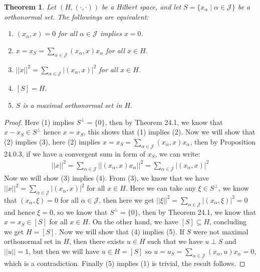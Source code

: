 \documentclass[11pt]{book}
\theoremstyle{break}
\theoremstyle{break}
\newtheorem{thm}{Theorem}[section]
\begin{document}
\begin{thm}
Let $(H,(\cdot,\cdot))$ be a Hilbert space, and let $S = \{x_\alpha \mid \alpha \in \mathcal{J}\}$ be a orthonormal set. The followings are equivalent:
\begin{enumerate}[topsep=3pt,itemsep=-1ex,partopsep=1ex,parsep=1ex]
\item $(x_\alpha ,x) = 0$ for all $\alpha \in \mathcal{J}$ implies $x = 0$.
\item $x = x_S = \sum_{\alpha \in \mathcal{J}}(x_\alpha, x) x_\alpha $ for all $x \in H$.
\item $||x||^2 =\sum_{\alpha \in \mathcal{J}}|(x_\alpha ,x)|^2$ for all $x \in H$.
\item $[S] = H$.
\item $S$ is a maximal orthonormal set in $H$.
\end{enumerate}
\end{thm}
\begin{proof}
Here (1) implies $S^{\perp} = \{0\}$, then by Theorem 24.1, we know that $x-x_S \in S^{\perp}$ hence $x = x_S$, this shows that (1) implies (2). Now we will show that (2) implies (3), here (2) implies $x = x_S = \sum_{\alpha \in \mathcal{J}}(x_\alpha, x)x_\alpha $, then by Proposition 24.0.3, if we have a convergent sum in form of $x_S$, we can write:
\begin{align*}
||x||^2 = \sum_{\alpha \in \mathcal{J}}||(x_\alpha , x) x_\alpha||^2 = \sum_{\alpha \in \mathcal{J}}|(x_\alpha ,x)|^2
\end{align*}
Now we will show (3) implies (4). From (3), we know that we have $||x||^2 =\sum_{\alpha \in \mathcal{J}}|(x_\alpha ,x)|^2$ for all $x \in H$. Here we can take any $\xi \in S^{\perp}$, we know that $(x_\alpha , \xi) = 0$ for all $\alpha \in \mathcal{J}$, then here we get $||\xi||^2 =\sum_{\alpha \in \mathcal{J}}|(x_\alpha ,\xi)|^2= 0$ and hence $\xi = 0$, so we know that $S^{\perp} = \{0\}$, then by Theorem 24.1, we know that $x= x_S \in [S]$ for all $x \in H$. On the other hand, we have $[S] \subseteq H$, concluding we get $H = [S]$. Now we will show that (4) implies (5). If $S$ were not maximal orthonormal set in $H$, then there exists $u \in H$ such that we have $u \perp S$ and $||u||=1$, but then we will have $u \in H = [S]$ so $u = u_S = \sum_{\alpha \in \mathcal{J}}(x_\alpha, u)x_\alpha = 0$, which is a contradiction. Finally (5) implies (1) is trivial, the result follows. 
\end{proof}
\end{document}

